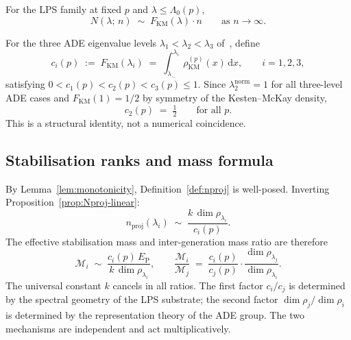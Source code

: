     \begin{proposition}
      \label{prop:Nproj-linear}
      For the LPS family at fixed $p$ and $\lambda \leq \Lambda_0(p)$,
      \begin{equation}
        \label{eq:Nproj-linear}
        N(\lambda;\, n) \;\sim\; F_{\mathrm{KM}}(\lambda)\cdot n
        \qquad \text{as } n \to \infty.
      \end{equation}
    \end{proposition}

    \noindent
    For the three ADE eigenvalue levels $\lambda_1 < \lambda_2 < \lambda_3$
    of~\cite{Beau2026a4}, define
    \begin{equation}
      \label{eq:KM-coefficients}
      c_i(p) \;:=\; F_{\mathrm{KM}}(\lambda_i)
      \;=\; \int_{\lambda_-}^{\lambda_i} \rho_{\mathrm{KM}}^{(p)}(x)\,\mathrm{d}x,
      \qquad i = 1,2,3,
    \end{equation}
    satisfying $0 < c_1(p) < c_2(p) < c_3(p) \leq 1$.
    Since $\lambda_2^{\mathrm{norm}} = 1$ for all three-level ADE cases and
    $F_{\mathrm{KM}}(1) = 1/2$ by symmetry of the Kesten--McKay density,
    \begin{equation}
      \label{eq:c2-universal}
      c_2(p) \;=\; \tfrac{1}{2}
      \qquad \text{for all } p.
    \end{equation}
    This is a structural identity, not a numerical coincidence.

  \subsection{Stabilisation ranks and mass formula}
    \label{sec:spectral:stabilisation}

    By Lemma~\ref{lem:monotonicity}, Definition~\ref{def:nproj} is well-posed.
    Inverting Proposition~\ref{prop:Nproj-linear}:
    \begin{equation}
      \label{eq:nproj-value}
      n_{\mathrm{proj}}(\lambda_i)
      \;\sim\; \frac{k\,\dim\rho_{\lambda_i}}{c_i(p)}.
    \end{equation}
    The effective stabilisation mass and inter-generation mass ratio are therefore
    \begin{equation}
      \label{eq:mass-formula}
      \mathcal{M}_i
      \;\sim\; \frac{c_i(p)\,E_{\mathrm{P}}}{k\,\dim\rho_{\lambda_i}},
      \qquad
      \frac{\mathcal{M}_i}{\mathcal{M}_j}
      \;=\; \frac{c_i(p)}{c_j(p)}\cdot
      \frac{\dim\rho_{\lambda_j}}{\dim\rho_{\lambda_i}}.
    \end{equation}
    The universal constant $k$ cancels in all ratios.
    The first factor $c_i/c_j$ is determined by the spectral geometry of the LPS
    substrate; the second factor $\dim\rho_j/\dim\rho_i$ is determined by the
    representation theory of the ADE group.
    The two mechanisms are independent and act multiplicatively.
